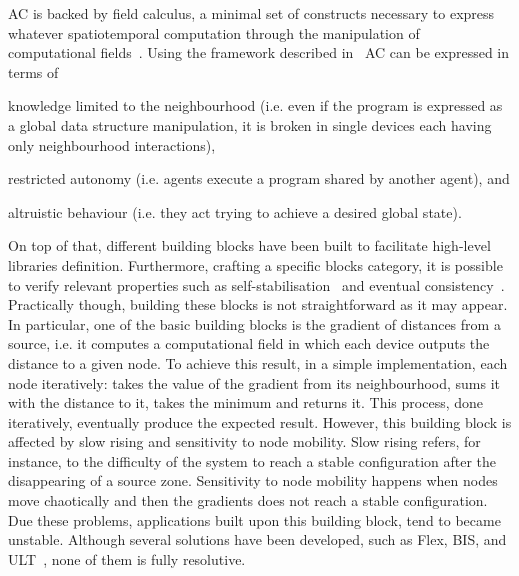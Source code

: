\documentclass[conference]{IEEEtran}
\begin{document}
AC is backed by field calculus, a minimal set of constructs necessary to express whatever spatiotemporal computation through the manipulation of computational fields~\cite{DBLP:conf/coordination/AudritoBDV18}. 
%
Using the framework described in~\cite{DAngelo2019} AC can be expressed in terms of 
\begin{enumerate*}[label=(\roman*)]
    \item knowledge limited to the neighbourhood (i.e. even if the program is expressed as a global data structure manipulation, it is broken in single devices each having only neighbourhood interactions), 
    \item restricted autonomy (i.e. agents execute a program shared by another agent), and 
    \item altruistic behaviour (i.e. they act trying to achieve a desired global state).
\end{enumerate*}
%
On top of that, different building blocks have been built to facilitate high-level libraries definition.
%
Furthermore, crafting a specific blocks category, it is possible to verify relevant properties such as self-stabilisation~\cite{DBLP:conf/coordination/ViroliD14} and eventual consistency~\cite{DBLP:conf/saso/BealVPD16}.
%
Practically though, building these blocks is not straightforward as it may appear. 
%
In particular, one of the basic building blocks is the gradient of distances from a source, i.e. it computes a computational field in which each device outputs the distance to a given node.
%
To achieve this result, in a simple implementation, each node iteratively: takes the value of the gradient from its neighbourhood, sums it with the distance to it, takes the minimum and returns it.
%
This process, done iteratively, eventually produce the expected result.
%
However, this building block is affected by slow rising and 
sensitivity to node mobility.
%
Slow rising refers, for instance, to the difficulty of the system to reach a stable configuration after the disappearing of a source zone.
%
Sensitivity to node mobility happens when nodes move chaotically and then the gradients does not reach a stable configuration.
%
Due these problems, applications built upon this building block, tend to became unstable.
%
Although several solutions have been developed, such as Flex, BIS, and ULT~\cite{DBLP:conf/saso/AudritoCDV17}, none of them is fully resolutive.
\end{document}
